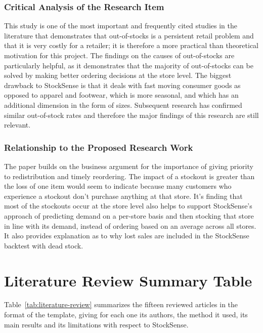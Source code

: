 \documentclass{StockSense}
\begin{document}
\subsubsection{Critical Analysis of the Research Item}

This study is one of the most important and frequently cited studies in the literature that demonstrates that out-of-stocks is a persistent retail problem and that it is very costly for a retailer; it is therefore a more practical than theoretical motivation for this project. The findings on the causes of out-of-stocks are particularly helpful, as it demonstrates that the majority of out-of-stocks can be solved by making better ordering decisions at the store level. The biggest drawback to StockSense is that it deals with fast moving consumer goods as opposed to apparel and footwear, which is more seasonal, and which has an additional dimension in the form of sizes. Subsequent research has confirmed similar out-of-stock rates and therefore the major findings of this research are still relevant.

\subsubsection{Relationship to the Proposed Research Work}

The paper builds on the business argument for the importance of giving priority to redistribution and timely reordering. The impact of a stockout is greater than the loss of one item would seem to indicate because many customers who experience a stockout don't purchase anything at that store. It's finding that most of the stockouts occur at the store level also helps to support StockSense's approach of predicting demand on a per-store basis and then stocking that store in line with its demand, instead of ordering based on an average across all stores. It also provides explanation as to why lost sales are included in the StockSense backtest with dead stock.

\section{Literature Review Summary Table}

Table~\ref{tab:literature-review} summarizes the fifteen reviewed articles in the format of the template, giving for each one its authors, the method it used, its main results and its limitations with respect to StockSense.
\end{document}
